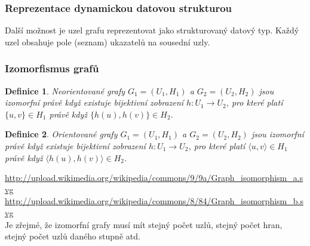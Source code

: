 \documentclass[10pt,a4paper]{article}
\newtheorem{definition}{Definice}
\begin{document}
\subsubsection{Reprezentace dynamickou datovou strukturou}
Další možnost je uzel grafu reprezentovat jako strukturovaný datový typ. Každý uzel obsahuje pole (seznam) ukazatelů na sousední uzly.
\subsubsection{Izomorfismus grafů}
\begin{definition}
Neorientované grafy $G_1 = (U_1, H_1)$ a $G_2 = (U_2, H_2)$ jsou izomorfní právě když existuje bijektivní zobrazení $h: U_1 \rightarrow U_2$, pro které platí $\{u, v\} \in H_1$ právě když $\{h(u), h(v)\} \in H_2$.
\end{definition}
\begin{definition}
Orientované grafy $G_1 = (U_1, H_1)$ a $G_2 = (U_2, H_2)$ jsou izomorfní právě když existuje bijektivní zobrazení $h: U_1 \rightarrow U_2$, pro které platí $\langle u, v\rangle \in H_1$ právě když $\langle h(u), h(v)\rangle \in H_2$.
\end{definition}
\url{http://upload.wikimedia.org/wikipedia/commons/9/9a/Graph_isomorphism_a.svg} \\
\url{http://upload.wikimedia.org/wikipedia/commons/8/84/Graph_isomorphism_b.svg} \\
Je zřejmé, že izomorfní grafy musí mít stejný počet uzlů, stejný počet hran, stejný počet uzlů daného stupně atd.
\end{document}
